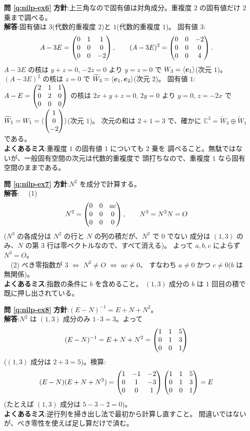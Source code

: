 \bigskip
\noindent\textbf{問 \ref{q:nilp-ex6}}\quad
\textbf{方針}:上三角なので固有値は対角成分。重複度 $2$ の固有値だけ
$2$ 乗まで調べる。\\
\textbf{解答}:固有値は $3$(代数的重複度 $2$)と $1$(代数的重複度 $1$)。
固有値 $3$:
\[
A - 3E = \begin{pmatrix}0 & 1 & 1 \\ 0 & 0 & 0 \\ 0 & 0 & -2\end{pmatrix}, \qquad
(A - 3E)^2 = \begin{pmatrix}0 & 0 & -2 \\ 0 & 0 & 0 \\ 0 & 0 & 4\end{pmatrix}.
\]
$A - 3E$ の核は $y + z = 0$, $-2z = 0$ より $y = z = 0$ で
$W_3 = \langle \bm{e}_1 \rangle$(次元 $1$)。
$(A - 3E)^2$ の核は $z = 0$ で
$\widetilde{W}_3 = \langle \bm{e}_1, \bm{e}_2 \rangle$(次元 $2$)。
固有値 $1$:
$A - E = \begin{pmatrix}2 & 1 & 1 \\ 0 & 2 & 0 \\ 0 & 0 & 0\end{pmatrix}$ の核は
$2x + y + z = 0$, $2y = 0$ より $y = 0$, $z = -2x$ で
$\widetilde{W}_1 = W_1 = \langle \begin{pmatrix}1 \\ 0 \\ -2\end{pmatrix} \rangle$(次元 $1$)。
次元の和は $2 + 1 = 3$ で、確かに
$\mathbb{C}^3 = \widetilde{W}_3 \oplus \widetilde{W}_1$ である。\\
\textbf{よくあるミス}:重複度 $1$ の固有値 $1$ についても $2$ 乗を
調べること。無駄ではないが、一般固有空間の次元は代数的重複度で
頭打ちなので、重複度 $1$ なら固有空間のままである。

\bigskip
\noindent\textbf{問 \ref{q:nilp-ex7}}\quad
\textbf{方針}:$N^2$ を成分で計算する。\\
\textbf{解答}:
　(1)
\[
N^2 = \begin{pmatrix}0 & 0 & ac \\ 0 & 0 & 0 \\ 0 & 0 & 0\end{pmatrix}, \qquad
N^3 = N^2 N = O
\]
($N^3$ の各成分は $N^2$ の行と $N$ の列の積だが、$N^2$ で $0$ でない
成分は $(1,3)$ のみ、$N$ の第 $3$ 行は零ベクトルなので、すべて消える)。
よって $a, b, c$ によらず $N^3 = O$。\\
　(2) べき零指数が $3$ $\iff$ $N^2 \neq O$ $\iff$ $ac \neq 0$、
すなわち $a \neq 0$ かつ $c \neq 0$($b$ は無関係)。\\
\textbf{よくあるミス}:指数の条件に $b$ を含めること。
$(1,3)$ 成分の $b$ は $1$ 回目の積で既に押し出されている。

\bigskip
\noindent\textbf{問 \ref{q:nilp-ex8}}\quad
\textbf{方針}:$(E - N)^{-1} = E + N + N^2$。\\
\textbf{解答}:$N^2$ は $(1,3)$ 成分のみ $1 \cdot 3 = 3$。よって
\[
(E - N)^{-1} = E + N + N^2 = \begin{pmatrix}1 & 1 & 5 \\ 0 & 1 & 3 \\ 0 & 0 & 1\end{pmatrix}
\]
($(1,3)$ 成分は $2 + 3 = 5$)。検算:
\[
(E - N)(E + N + N^2) = \begin{pmatrix}1 & -1 & -2 \\ 0 & 1 & -3 \\ 0 & 0 & 1\end{pmatrix}
\begin{pmatrix}1 & 1 & 5 \\ 0 & 1 & 3 \\ 0 & 0 & 1\end{pmatrix} = E
\]
(たとえば $(1,3)$ 成分は $5 - 3 - 2 = 0$)。\\
\textbf{よくあるミス}:逆行列を掃き出し法で最初から計算し直すこと。
間違いではないが、べき零性を使えば足し算だけで済む。

